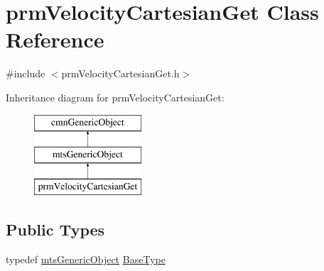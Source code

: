 \hypertarget{classprm_velocity_cartesian_get}{}\section{prm\+Velocity\+Cartesian\+Get Class Reference}
\label{classprm_velocity_cartesian_get}


{\ttfamily \#include $<$prm\+Velocity\+Cartesian\+Get.\+h$>$}

Inheritance diagram for prm\+Velocity\+Cartesian\+Get\+:\begin{figure}[H]
\begin{center}
\leavevmode
\includegraphics[height=3.000000cm]{d5/db4/classprm_velocity_cartesian_get}
\end{center}
\end{figure}
\subsection*{Public Types}
\begin{DoxyCompactItemize}
\item 
typedef \hyperlink{classmts_generic_object}{mts\+Generic\+Object} \hyperlink{classprm_velocity_cartesian_get_a49e1fbc1e4ec5d09b4a9660564a1b547}{Base\+Type}
\end{DoxyCompactItemize}
